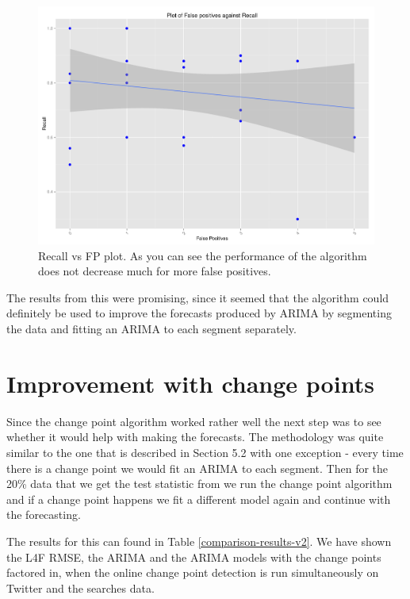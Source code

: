 \documentclass[minf,twoside,singlespacing,parskip,notimes,deptreport]{infthesis} %
\begin{document}
\begin{figure}[h!]
\begin{center}
\includegraphics[width=\textwidth]{FP_vs_Recall}
\end{center}
\caption{Recall vs FP plot. As you can see the performance of the algorithm does not decrease much for more false positives.}
\label{fprecall}
\end{figure}

The results from this were promising, since it seemed that the algorithm could definitely be used to improve the forecasts produced by ARIMA by segmenting the data and fitting an ARIMA to each segment separately.

\section{Improvement with change points}

Since the change point algorithm worked rather well the next step was to see whether it would help with making the forecasts. The methodology was quite similar to the one that is described in Section 5.2 with one exception - every time there is a change point we would fit an ARIMA to each segment. Then for the 20\% data that we get the test statistic from we run the change point algorithm and if a change point happens we fit a different model again and continue with the forecasting.

The results for this can found in Table \ref{comparison-results-v2}. We have shown the L4F RMSE, the ARIMA and the ARIMA models with the change points factored in, when the online change point detection is run simultaneously on Twitter and the searches data. 
\end{document}
